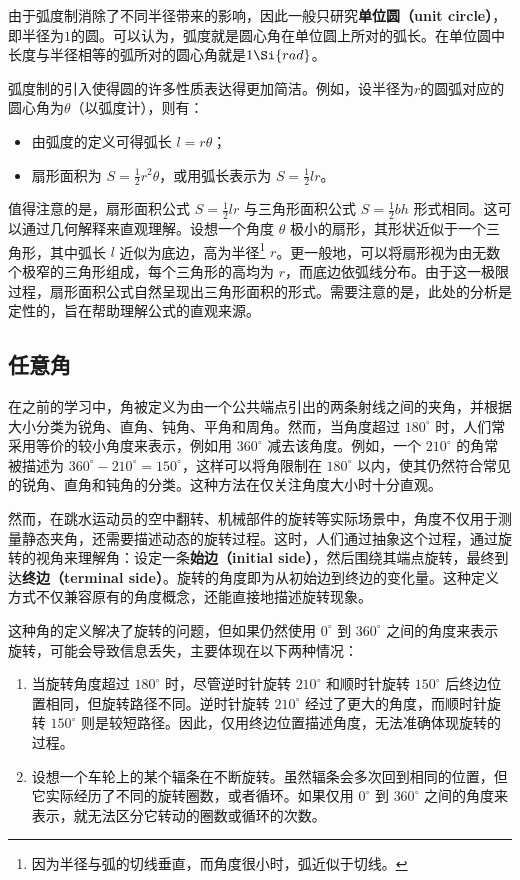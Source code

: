 由于弧度制消除了不同半径带来的影响，因此一般只研究\textbf{单位圆（unit circle）}，即半径为$1$的圆。可以认为，弧度就是圆心角在单位圆上所对的弧长。在单位圆中长度与半径相等的弧所对的圆心角就是$1 \Si{rad}$。

弧度制的引入使得圆的许多性质表达得更加简洁。例如，设半径为$r$的圆弧对应的圆心角为$\theta$（以弧度计），则有：
\begin{itemize}
\item 由弧度的定义可得弧长 $l = r\theta$；
\item 扇形面积为 $\displaystyle S = \frac{1}{2} r^2 \theta$，或用弧长表示为 $\displaystyle S = \frac{1}{2} l r$。
\end{itemize}

值得注意的是，扇形面积公式 $\displaystyle S = \frac{1}{2} l r$ 与三角形面积公式 $\displaystyle S = \frac{1}{2} bh$ 形式相同。这可以通过几何解释来直观理解。设想一个角度 $\theta$ 极小的扇形，其形状近似于一个三角形，其中弧长 $l$ 近似为底边，高为半径\footnote{因为半径与弧的切线垂直，而角度很小时，弧近似于切线。} $r$。更一般地，可以将扇形视为由无数个极窄的三角形组成，每个三角形的高均为 $r$，而底边依弧线分布。由于这一极限过程，扇形面积公式自然呈现出三角形面积的形式。需要注意的是，此处的分析是定性的，旨在帮助理解公式的直观来源。


\subsection{任意角}

在之前的学习中，角被定义为由一个公共端点引出的两条射线之间的夹角，并根据大小分类为锐角、直角、钝角、平角和周角。然而，当角度超过 $180^\circ$ 时，人们常采用等价的较小角度来表示，例如用 $360^\circ$ 减去该角度。例如，一个 $210^\circ$ 的角常被描述为 $360^\circ - 210^\circ = 150^\circ$，这样可以将角限制在 $180^\circ$ 以内，使其仍然符合常见的锐角、直角和钝角的分类。这种方法在仅关注角度大小时十分直观。

然而，在跳水运动员的空中翻转、机械部件的旋转等实际场景中，角度不仅用于测量静态夹角，还需要描述动态的旋转过程。这时，人们通过抽象这个过程，通过旋转的视角来理解角：设定一条\textbf{始边（initial side）}，然后围绕其端点旋转，最终到达\textbf{终边（terminal side）}。旋转的角度即为从初始边到终边的变化量。这种定义方式不仅兼容原有的角度概念，还能直接地描述旋转现象。

这种角的定义解决了旋转的问题，但如果仍然使用 $0^\circ$ 到 $360^\circ$ 之间的角度来表示旋转，可能会导致信息丢失，主要体现在以下两种情况：
\begin{enumerate}
\item 当旋转角度超过 $180^\circ$ 时，尽管逆时针旋转 $210^\circ$ 和顺时针旋转 $150^\circ$ 后终边位置相同，但旋转路径不同。逆时针旋转 $210^\circ$ 经过了更大的角度，而顺时针旋转 $150^\circ$ 则是较短路径。因此，仅用终边位置描述角度，无法准确体现旋转的过程。
\item 设想一个车轮上的某个辐条在不断旋转。虽然辐条会多次回到相同的位置，但它实际经历了不同的旋转圈数，或者循环。如果仅用 $0^\circ$ 到 $360^\circ$ 之间的角度来表示，就无法区分它转动的圈数或循环的次数。
\end{enumerate}

